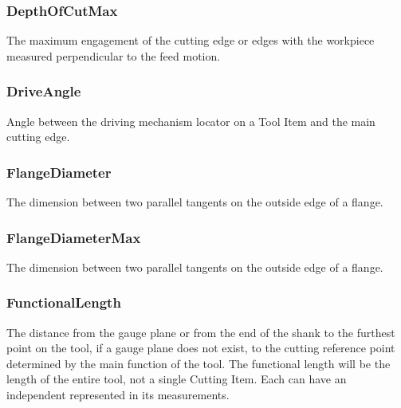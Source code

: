 \subsubsection{DepthOfCutMax}
\label{sec:DepthOfCutMax}



The maximum engagement of the cutting edge or edges with the workpiece measured perpendicular to the feed motion.



\subsubsection{DriveAngle}
\label{sec:DriveAngle}



Angle between the driving mechanism locator on a Tool Item and the main cutting edge.



\subsubsection{FlangeDiameter}
\label{sec:FlangeDiameter}



The dimension between two parallel tangents on the outside edge of a flange.



\subsubsection{FlangeDiameterMax}
\label{sec:FlangeDiameterMax}



The dimension between two parallel tangents on the outside edge of a flange.



\subsubsection{FunctionalLength}
\label{sec:FunctionalLength}



The distance from the gauge plane or from the end of the shank to the furthest point on the tool, if a gauge plane does not exist, to the cutting reference point determined by the main function of the tool. The  functional length will be the length of the entire tool, not a single Cutting Item. Each  can have an independent  represented in its measurements. 



